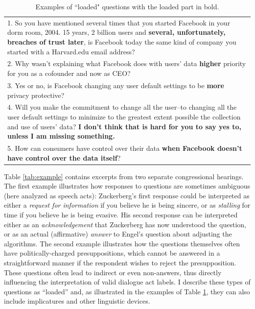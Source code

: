 \begin{table}[t]
    \centering
    \begin{tabular}{p{11cm}}
    \toprule
1. So you have mentioned several times that you started Facebook in your dorm room, 2004. 15 years, 2 billion users and \textbf{several, unfortunately, breaches of trust later}, is Facebook today the same kind of company you started with a Harvard.edu email address?\\
2. Why wasn't explaining what Facebook does with users' data \textbf{higher} priority for you as a cofounder and now as CEO? \\
3. Yes or no, is Facebook changing any user default settings to be \textbf{more} privacy protective? \\
4. Will you make the commitment to change all the user--to changing all the user default settings to minimize to the greatest extent possible the collection and use of users' data? \textbf{I don't think that is hard for you to say yes to, unless I am missing something.}\\
5. How can consumers have control over their data \textbf{when Facebook doesn't have control over the data itself}?\\
    \bottomrule
    \end{tabular}
    \caption{Examples of ``loaded" questions with the loaded part in bold.}
    \label{tab:example_loaded}
\end{table}

Table \ref{tab:example} contains excerpts from two separate congressional hearings. The first example illustrates how responses to questions are sometimes ambiguous (here analyzed as speech acts): Zuckerberg's first response could be interpreted as either a \emph{request for information} if you believe he is being sincere, or as \emph{stalling} for time if you believe he is being evasive. His second response can be interpreted either as an \emph{acknowledgement} that Zuckerberg has now understood the question, or as an actual (affirmative) \emph{answer} to Engel's question about adjusting the algorithms. The second example illustrates how the questions themselves often have politically-charged presuppositions, which cannot be answered in a straightforward manner if the respondent wishes to reject the presupposition. These questions often lead to indirect or even non-answers, thus directly influencing the interpretation of valid dialogue act labels. I describe these types of questions as ``loaded'' and, as illustrated in the examples of Table \ref{tab:example_loaded}, they can also include implicatures and other linguistic devices. 

